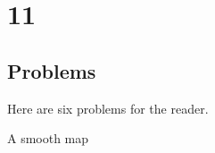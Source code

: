 \chapter{11}\label{ch-11}


\label{p-130}
\section*{Problems}
Here are six problems for the reader.

\begin{problem}\label{prob-11-A}
	A smooth map 
\end{problem}